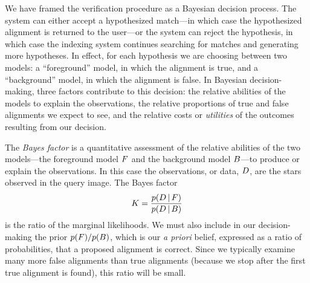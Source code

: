 We have framed the verification procedure as a Bayesian decision
process.  The system can either accept a hypothesized match---in which
case the hypothesized alignment is returned to the user---or the
system can reject the hypothesis, in which case the indexing system
continues searching for matches and generating more hypotheses.  In
effect, for each hypothesis we are choosing between two models: a
``foreground'' model, in which the alignment is true, and a
``background'' model, in which the alignment is false.  In Bayesian
decision-making, three factors contribute to this decision: the
relative abilities of the models to explain the observations, the
relative proportions of true and false alignments we expect to see,
and the relative costs or \emph{utilities} of the outcomes resulting
from our decision.


The \emph{Bayes factor} is a quantitative assessment of the relative
abilities of the two models---the foreground model $F$ and the
background model $B$---to produce or explain the observations.  In
this case the observations, or data, $D$, are the stars observed
in the query image.  The Bayes factor
\begin{equation}
K = \frac{p(D \,\vert\, F)}{p(D \,\vert\, B)}
\end{equation}
is the ratio of the marginal likelihoods.  We must also include in our
decision-making the prior $p(F)/p(B)$, which is our \emph{a
priori} belief, expressed as a ratio of probabilities, that a proposed
alignment is correct.  Since we typically examine many more false
alignments than true alignments (because we stop after the first true
alignment is found), this ratio will be small.
%


